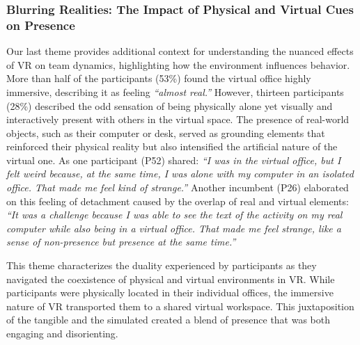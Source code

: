 \subsubsection{Blurring Realities: The Impact of Physical and Virtual Cues on Presence}
Our last theme provides additional context for understanding the nuanced effects of VR on team dynamics, highlighting how the environment influences behavior. More than half of the participants (53\%) found the virtual office highly immersive, describing it as feeling \textit{``almost real.''} However, thirteen participants (28\%) described the odd sensation of being physically alone yet visually and interactively present with others in the virtual space. The presence of real-world objects, such as their computer or desk, served as grounding elements that reinforced their physical reality but also intensified the artificial nature of the virtual one. As one participant (P52) shared: \textit{``I was in the virtual office, but I felt weird because, at the same time, I was alone with my computer in an isolated office. That made me feel kind of strange.''} Another incumbent (P26) elaborated on this feeling of detachment caused by the overlap of real and virtual elements: \textit{``It was a challenge because I was able to see the text of the activity on my real computer while also being in a virtual office. That made me feel strange, like a sense of non-presence but presence at the same time.''}

This theme characterizes the duality experienced by participants as they navigated the coexistence of physical and virtual environments in VR. While participants were physically located in their individual offices, the immersive nature of VR transported them to a shared virtual workspace. This juxtaposition of the tangible and the simulated created a blend of presence that was both engaging and disorienting.

